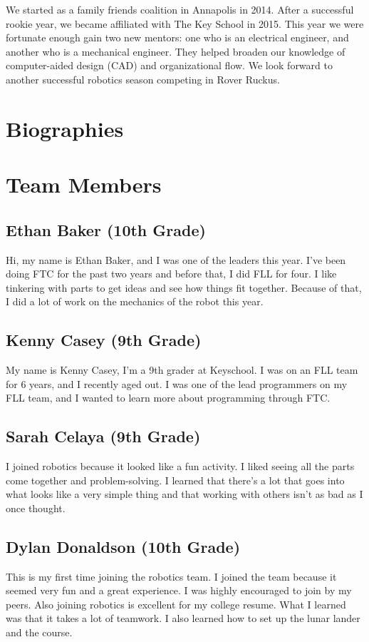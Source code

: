 \documentclass[12pt]{article}
\begin{document}
We started as a family friends coalition in Annapolis in 2014. After a successful rookie year, we became affiliated with The Key School in 2015. This year we were fortunate enough gain two new mentors: one who is an electrical engineer, and another who is a mechanical engineer. They helped broaden our knowledge of computer-aided design (CAD) and organizational flow. We look forward to another successful robotics season competing in Rover Ruckus.

\newpage
\setcounter{section}{0}

\section*{Biographies}

\section{Team Members}

\subsection{Ethan Baker (10th Grade)}
Hi, my name is Ethan Baker, and I was one of the leaders this year. I've been doing FTC for the past two years and before that, I did FLL for four. I like tinkering with parts to get ideas and see how things fit together. Because of that, I did a lot of work on the mechanics of the robot this year.

\subsection{Kenny Casey (9th Grade)}
My name is Kenny Casey, I'm a 9th grader at Keyschool. I was on an FLL team for 6 years, and I recently aged out. I was one of the lead programmers on my FLL team, and I wanted to learn more about programming through FTC.

\subsection{Sarah Celaya (9th Grade)}
I joined robotics because it looked like a fun activity. I liked seeing all the parts come together and problem-solving. I learned that there’s a lot that goes into what looks like a very simple thing and that working with others isn’t as bad as I once thought. 

\subsection{Dylan Donaldson (10th Grade)}
This is my first time joining the robotics team. I joined the team because it seemed very fun and a great experience. I was highly encouraged to join by my peers. Also joining robotics is excellent for my college resume. What I learned was that it takes a lot of teamwork. I also learned how to set up the lunar lander and the course.
\end{document}
